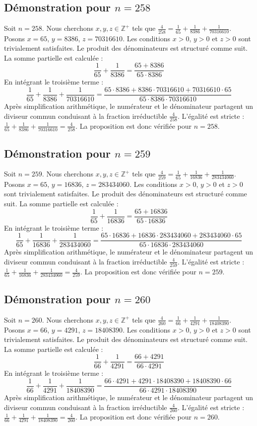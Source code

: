 \documentclass[11pt,a4paper]{article}
\begin{document}
\subsection{Démonstration pour $n = 258$}
Soit $n = 258$. Nous cherchons $x, y, z \in \mathbb{Z}^{+}$ tels que $\frac{4}{258} = \frac{1}{65} + \frac{1}{8386} + \frac{1}{70316610}$.
Posons $x = 65$, $y = 8386$, $z = 70316610$.
Les conditions $x > 0$, $y > 0$ et $z > 0$ sont trivialement satisfaites.
Le produit des dénominateurs est structuré comme suit. La somme partielle est calculée :
$$ \frac{1}{65} + \frac{1}{8386} = \frac{65+8386}{65 \cdot 8386} $$
En intégrant le troisième terme :
$$ \frac{1}{65} + \frac{1}{8386} + \frac{1}{70316610} = \frac{65 \cdot 8386 + 8386 \cdot 70316610 + 70316610 \cdot 65}{65 \cdot 8386 \cdot 70316610} $$
Après simplification arithmétique, le numérateur et le dénominateur partagent un diviseur commun conduisant à la fraction irréductible $\frac{4}{258}$.
L'égalité est stricte : $\frac{1}{65} + \frac{1}{8386} + \frac{1}{70316610} = \frac{4}{258}$.
La proposition est donc vérifiée pour $n = 258$.
\subsection{Démonstration pour $n = 259$}
Soit $n = 259$. Nous cherchons $x, y, z \in \mathbb{Z}^{+}$ tels que $\frac{4}{259} = \frac{1}{65} + \frac{1}{16836} + \frac{1}{283434060}$.
Posons $x = 65$, $y = 16836$, $z = 283434060$.
Les conditions $x > 0$, $y > 0$ et $z > 0$ sont trivialement satisfaites.
Le produit des dénominateurs est structuré comme suit. La somme partielle est calculée :
$$ \frac{1}{65} + \frac{1}{16836} = \frac{65+16836}{65 \cdot 16836} $$
En intégrant le troisième terme :
$$ \frac{1}{65} + \frac{1}{16836} + \frac{1}{283434060} = \frac{65 \cdot 16836 + 16836 \cdot 283434060 + 283434060 \cdot 65}{65 \cdot 16836 \cdot 283434060} $$
Après simplification arithmétique, le numérateur et le dénominateur partagent un diviseur commun conduisant à la fraction irréductible $\frac{4}{259}$.
L'égalité est stricte : $\frac{1}{65} + \frac{1}{16836} + \frac{1}{283434060} = \frac{4}{259}$.
La proposition est donc vérifiée pour $n = 259$.
\subsection{Démonstration pour $n = 260$}
Soit $n = 260$. Nous cherchons $x, y, z \in \mathbb{Z}^{+}$ tels que $\frac{4}{260} = \frac{1}{66} + \frac{1}{4291} + \frac{1}{18408390}$.
Posons $x = 66$, $y = 4291$, $z = 18408390$.
Les conditions $x > 0$, $y > 0$ et $z > 0$ sont trivialement satisfaites.
Le produit des dénominateurs est structuré comme suit. La somme partielle est calculée :
$$ \frac{1}{66} + \frac{1}{4291} = \frac{66+4291}{66 \cdot 4291} $$
En intégrant le troisième terme :
$$ \frac{1}{66} + \frac{1}{4291} + \frac{1}{18408390} = \frac{66 \cdot 4291 + 4291 \cdot 18408390 + 18408390 \cdot 66}{66 \cdot 4291 \cdot 18408390} $$
Après simplification arithmétique, le numérateur et le dénominateur partagent un diviseur commun conduisant à la fraction irréductible $\frac{4}{260}$.
L'égalité est stricte : $\frac{1}{66} + \frac{1}{4291} + \frac{1}{18408390} = \frac{4}{260}$.
La proposition est donc vérifiée pour $n = 260$.
\end{document}
